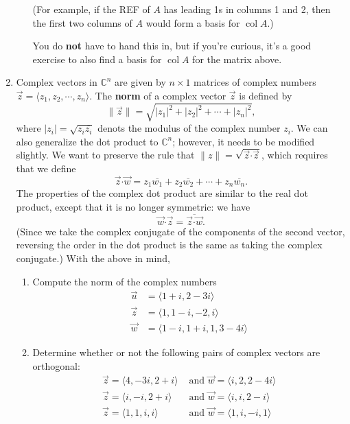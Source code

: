 \documentclass[letterpaper,12pt]{article}
\newcommand{\len}[1]{\lVert #1\rVert}
\newcommand{\abs}[1]{\lvert #1\rvert}
\newcommand{\C}{\mathbb{C}}
\newcommand{\dotp}{\boldsymbol{\cdot}}
\DeclareMathOperator{\col}{col}
\begin{document}
\begin{enumerate}
\begin{enumerate}
(For example, if the REF of $A$ has leading 1s in columns 1 and 2, then the first two columns of $A$ would form a basis for $\col A$.) 

You do {\bf not} have to hand this in, but if you're curious, it's a good exercise to also find a basis for $\col A$ for the matrix above.
\end{enumerate}
\item Complex vectors in $\C^n$ are given by $n\times 1$ matrices of complex numbers $\vec{z} = \langle z_1, z_2, \cdots ,  z_n\rangle$. The {\bf norm} of a complex vector $\vec{z}$ is defined by
\[
 \len{\vec{z}} = \sqrt{\abs{z_1}^2+\abs{z_2}^2+\cdots + \abs{z_n}^2},
\]
where $\abs{z_i} = \sqrt{z_i\overline{z_i}}$ denots the modulus of the complex number $z_i$. We can also generalize the dot product to $\C^n$; however, it needs to be modified slightly. We want to preserve the rule that $\len{z} = \sqrt{\vec{z}\dotp\vec{z}}$, which requires that we define
\[
 \vec{z}\dotp \vec{w} = z_1\overline{w_1}+z_2\overline{w_2}+\cdots +z_n\overline{w_n}.
\]
The properties of the complex dot product are similar to the real dot product, except that it is no longer symmetric: we have
\[
 \vec{w}\dotp \vec{z} = \overline{\vec{z}\dotp\vec{w}}.
\]
(Since we take the complex conjugate of the components of the second vector, reversing the order in the dot product is the same as taking the complex conjugate.) With the above in mind,
\begin{enumerate}
 \item Compute the norm of the complex numbers
\begin{align*}
 \vec{u} & = \langle 1+i, 2-3i\rangle\\
 \vec{z} & = \langle 1, 1-i, -2, i\rangle\\
 \vec{w} & = \langle 1-i, 1+i, 1, 3-4i\rangle
\end{align*}
 \item Determine whether or not the following pairs of complex vectors are orthogonal:
\begin{align*}
 \vec{z} = \langle 4, -3i,2+i\rangle & \text{ and } \vec{w} = \langle i, 2, 2-4i\rangle\\
 \vec{z} = \langle i, -i, 2+i\rangle &\text{ and } \vec{w} = \langle i, i, 2-i\rangle\\
 \vec{z} = \langle 1, 1, i, i\rangle & \text{ and } \vec{w} = \langle 1, i, -i, 1\rangle
\end{align*}


\end{enumerate}
\end{enumerate}
\end{document}
